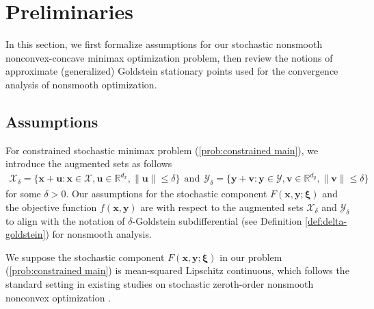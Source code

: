 \documentclass[11pt]{article}
\def\vu{\mathbf{u}}
\def\vv{\mathbf{v}}
\def\vx{\mathbf{x}}
\def\vy{\mathbf{y}}
\def\vxi{\bm{\xi}}
\def\fX{{\mathcal{X}}}
\def\fY{{\mathcal{Y}}}
\def\BR{{\mathbb{R}}}
\begin{document}
\section{Preliminaries}\label{sec: Preliminary}

In this section, we first formalize assumptions for our stochastic nonsmooth nonconvex-concave minimax optimization problem, 
then review the notions of approximate (generalized) Goldstein stationary points used for the convergence analysis of nonsmooth optimization.

\subsection{Assumptions}

For constrained stochastic minimax problem (\ref{prob:constrained main}), we introduce the augmented sets as follows
\begin{align}\label{dfn:XY-delta}
\fX_\delta = \{\vx+\vu: \vx\in\fX,\vu\in\BR^{d_x},\|\vu\|\leq\delta\}
~~\text{and}~~
\fY_\delta = \{\vy+\vv: \vy\in\fY,\vv\in\BR^{d_y},\|\vv\|\leq\delta\}
\end{align}
for some $\delta>0$.
Our assumptions for the stochastic component $F(\vx,\vy;\vxi)$ and the objective function $f(\vx,\vy)$ are with respect to the augmented sets $\fX_\delta$ and $\fY_\delta$ to align with the notation of $\delta$-Goldstein subdifferential (see Definition \ref{def:delta-goldstein}) for nonsmooth analysis.

We suppose the stochastic component $F(\vx,\vy;\vxi)$ in our problem (\ref{prob:constrained main}) is mean-squared Lipschitz continuous, which follows the standard setting in existing studies on stochastic zeroth-order nonsmooth nonconvex optimization \citep{lin2022gradient,chen2023faster,kornowski2024algorithm}.
\end{document}
